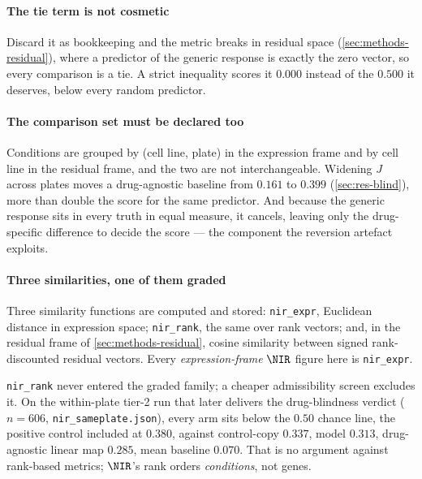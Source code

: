 \paragraph{The tie term is not cosmetic} Discard it as bookkeeping and the
metric breaks in residual space (\cref{sec:methods-residual}), where a predictor
of the generic response is exactly the zero vector, so every comparison is a
tie. A strict inequality scores it $0.000$ instead of the
$0.500$ it deserves, below every random predictor.

\paragraph{The comparison set must be declared too} Conditions are grouped by
(cell line, plate) in the expression frame and by cell line in the residual
frame, and the two are not interchangeable. Widening $J$ across plates moves a
drug-agnostic baseline from $0.161$ to $0.399$ (\cref{sec:res-blind}), more than
double the score for the same predictor. And because the generic
response sits in every truth in equal measure, it cancels, leaving only the
drug-specific difference to decide the score --- the component the reversion
artefact exploits.

\paragraph{Three similarities, one of them graded} Three similarity functions
are computed and stored: \texttt{nir\_expr}, Euclidean distance in expression
space; \texttt{nir\_rank}, the same over rank vectors; and, in the residual
frame of \cref{sec:methods-residual}, cosine
similarity between signed rank-discounted residual vectors. Every
\emph{expression-frame} $\NIR$ figure here is \texttt{nir\_expr}.

\texttt{nir\_rank} never entered the graded family; a cheaper admissibility
screen excludes it. On the within-plate tier-2 run that later delivers the
drug-blindness verdict ($n = \num{606}$, \texttt{nir\_sameplate.json}), every arm
sits below the $0.50$ chance line, the positive control included at $0.380$,
against control-copy $0.337$, model $0.313$, drug-agnostic linear map $0.285$,
mean baseline $0.070$. That is no argument against rank-based metrics;
$\NIR$'s rank orders \emph{conditions}, not genes.

